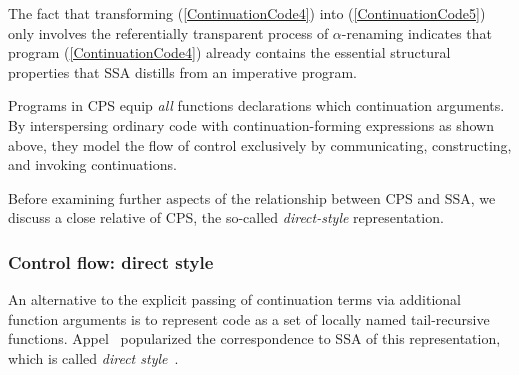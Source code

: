  The fact that transforming (\ref{ContinuationCode4}) into
(\ref{ContinuationCode5}) only involves the referentially transparent
process of $\alpha$-renaming indicates that program
(\ref{ContinuationCode4}) already contains the essential structural
properties that SSA distills from an imperative program.

Programs in CPS equip \emph{all} functions declarations which
continuation arguments. By interspersing ordinary code with
continuation-forming expressions as shown above, they model the flow
of control exclusively by communicating, constructing, and invoking
continuations.

Before examining further aspects of the relationship between CPS and
SSA, we discuss a close relative of CPS, the so-called
\emph{direct-style} representation.


\subsubsection{Control flow: direct style}
\label{section:Part1:Semantics:DirectStyle}
An alternative to the explicit passing of continuation terms via
additional function arguments is to represent code as a set of locally
named tail-recursive functions. Appel~\cite{Appel98:SSA} popularized
the correspondence to SSA of this representation, which is called
\emph{direct style}~\cite{Reynolds1974}.

